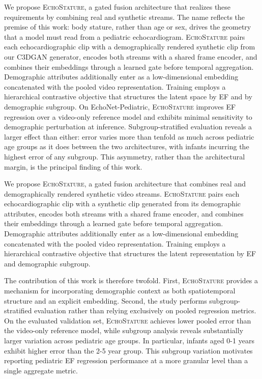 \documentclass{ws-procs11x85}
\begin{document}
{\color{blue}We propose \textsc{EchoStature}, a gated fusion architecture that realizes these requirements by combining real and synthetic streams. The name reflects the premise of this work: body stature, rather than age or sex, drives the geometry that a model must read from a pediatric echocardiogram. \textsc{EchoStature} pairs each echocardiographic clip with a demographically rendered synthetic clip from our C3DGAN generator, encodes both streams with a shared frame encoder, and combines their embeddings through a learned gate before temporal aggregation. Demographic attributes additionally enter as a low-dimensional embedding concatenated with the pooled video representation. Training employs a hierarchical contrastive objective that structures the latent space by EF and by demographic subgroup. On EchoNet-Pediatric, \textsc{EchoStature} improves EF regression over a video-only reference model and exhibits minimal sensitivity to demographic perturbation at inference. Subgroup-stratified evaluation reveals a larger effect than either: error varies more than tenfold as much across pediatric age groups as it does between the two architectures, with infants incurring the highest error of any subgroup. This asymmetry, rather than the architectural margin, is the principal finding of this work.
}

{\color{red}We propose \textsc{EchoStature}, a gated fusion architecture that combines real
and demographically rendered synthetic video streams. \textsc{EchoStature} pairs
each echocardiographic clip with a synthetic clip generated from its
demographic attributes, encodes both streams with a shared frame encoder,
and combines their embeddings through a learned gate before temporal
aggregation. Demographic attributes additionally enter as a low-dimensional
embedding concatenated with the pooled video representation. Training
employs a hierarchical contrastive objective that structures the latent
representation by EF and demographic subgroup.

The contribution of this work is therefore twofold. First, \textsc{EchoStature}
provides a mechanism for incorporating demographic context as both
spatiotemporal structure and an explicit embedding. Second, the study
performs subgroup-stratified evaluation rather than relying exclusively on
pooled regression metrics. On the evaluated validation set, \textsc{EchoStature}
achieves lower pooled error than the video-only reference model, while
subgroup analysis reveals substantially larger variation across pediatric
age groups. In particular, infants aged 0-1 years exhibit higher error than
the 2-5 year group. This subgroup variation motivates reporting
pediatric EF regression performance at a more granular level than a single
aggregate metric.
}
\end{document}

